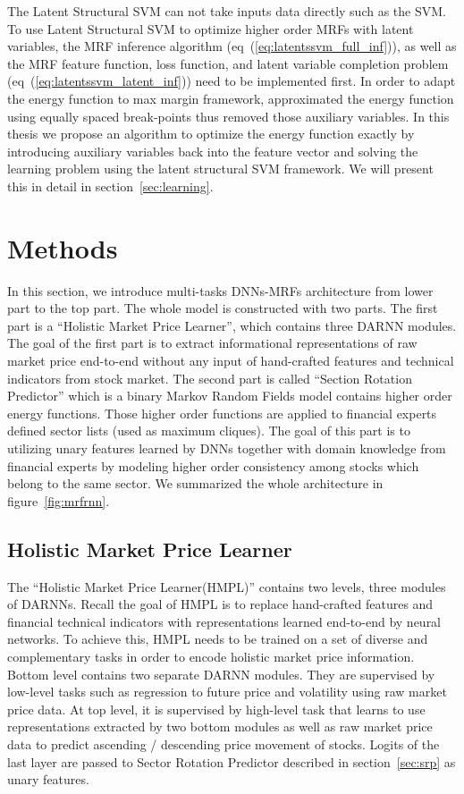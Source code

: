 \documentclass[sigconf, anonymous, review]{acmart}
\renewcommand{\citename}{\citet}
\renewcommand{\cite}{\citep}
\begin{document}
The Latent Structural SVM can not take inputs data directly such
as the SVM. To use Latent Structural SVM to optimize higher order
MRFs with latent variables, the MRF inference algorithm
(eq~(\ref{eq:latentssvm_full_inf})), as well as the MRF feature
function, loss function, and latent variable completion problem
(eq~(\ref{eq:latentssvm_latent_inf})) need to be implemented
first. In order to adapt the energy function to max margin
framework, \citename{Gould:ICML2011} approximated the energy
function using equally spaced break-points thus removed those
auxiliary variables. In this thesis we propose an algorithm to
optimize the energy function exactly by introducing auxiliary
variables back into the feature vector and solving the learning
problem using the latent structural SVM framework. We will
present this in detail in section~\ref{sec:learning}.

\section{Methods}
\label{sec:meth}

In this section, we introduce multi-tasks DNNs-MRFs
architecture from lower part to the top part. The whole model is
constructed with two parts. The first part is a ``Holistic Market
Price Learner'', which contains three DARNN modules. The goal of
the first part is to extract informational representations of raw
market price end-to-end without any input of hand-crafted
features and technical indicators from stock market. The second
part is called ``Section Rotation Predictor'' which is a binary
Markov Random Fields model contains higher order energy
functions. Those higher order functions are applied to financial
experts defined sector lists (used as maximum cliques). The goal
of this part is to utilizing unary features learned by DNNs together with
domain knowledge from financial experts by modeling
higher order consistency among stocks which belong to the same sector. We
summarized the whole architecture in figure~\ref{fig:mrfrnn}.


\subsection{Holistic Market Price Learner}
\label{sec:hmpl}

The ``Holistic Market Price Learner(HMPL)'' contains two levels,
three modules of DARNNs\cite{qin2017dual}. Recall the goal of
HMPL is to replace hand-crafted features and financial technical
indicators with representations learned end-to-end by neural
networks. To achieve this, HMPL needs to be trained on a set of
diverse and complementary tasks in order to encode holistic
market price information. Bottom level contains two separate
DARNN modules. They are supervised by low-level tasks such as
regression to future price and volatility using raw market price
data. At top level, it is supervised by high-level task that
learns to use representations extracted by two bottom modules as
well as raw market price data to predict ascending / descending
price movement of stocks. Logits of the last layer are passed to
Sector Rotation Predictor described in section~\ref{sec:srp} as
unary features.
\end{document}
